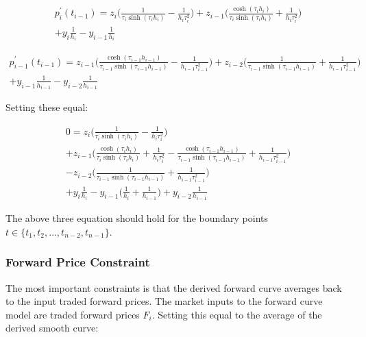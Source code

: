 \documentclass{article}
\begin{document}
\begin{multline}
    p^\prime_i(t_{i-1}) = z_i \biggl( \frac{1}{\tau_i \sinh(\tau_i h_i)} - \frac{1}{h_i \tau_i^2} \biggr) 
        + z_{i-1} \biggl( \frac{ \cosh(\tau_i h_i)}{\tau_i \sinh(\tau_i h_i)} + \frac{1}{h_i \tau_i^2} \biggr)\\
        + y_i \frac{1}{h_i} - y_{i - 1} \frac{1}{h_i}
\end{multline}

\begin{multline}
    p^\prime_{i-1}(t_{i-1}) = z_{i-1} \biggl( \frac{ \cosh(\tau_{i-1} h_{i-1})}{\tau_{i-1} \sinh(\tau_{i-1} h_{i-1})} - \frac{1}{h_{i-1} \tau_{i-1}^2} \biggr) 
        + z_{i-2} \biggl( \frac{1}{\tau_{i-1} \sinh(\tau_{i-1} h_{i-1})} + \frac{1}{h_{i-1} \tau_{i-1}^2} \biggr)\\
        + y_{i-1} \frac{1}{h_{i-1}} - y_{i-2} \frac{1}{h_{i-1}}
\end{multline}

Setting these equal:

\begin{multline}
    0 = z_i \biggl( \frac{1}{\tau_i \sinh(\tau_i h_i)} - \frac{1}{h_i \tau_i^2} \biggr) \\
        + z_{i-1} \biggl( \frac{ \cosh(\tau_i h_i)}{\tau_i \sinh(\tau_i h_i)} + \frac{1}{h_i \tau_i^2} 
        - \frac{ \cosh(\tau_{i-1} h_{i-1})}{\tau_{i-1} \sinh(\tau_{i-1} h_{i-1})} + \frac{1}{h_{i-1} \tau_{i-1}^2}\biggr)\\
        - z_{i-2} \biggl( \frac{1}{\tau_{i-1} \sinh(\tau_{i-1} h_{i-1})} + \frac{1}{h_{i-1} \tau_{i-1}^2} \biggr)\\
        + y_i \frac{1}{h_i} - y_{i - 1} \bigl( \frac{1}{h_i} + \frac{1}{h_{i-1}} \bigr)
        + y_{i-2} \frac{1}{h_{i-1}}
\end{multline}



\bigskip

The above three equation should hold for the boundary points \\
$t \in \{t_1, t_2, \hdots, t_{n-2}, t_{n-1}\}$.

\subsubsection{Forward Price Constraint}
The most important constraints is that the derived forward curve averages back to the 
input traded forward prices.
The market inputs to the forward curve model are traded forward prices $F_i$.
Setting this equal to the average of the derived smooth curve:
\end{document}
